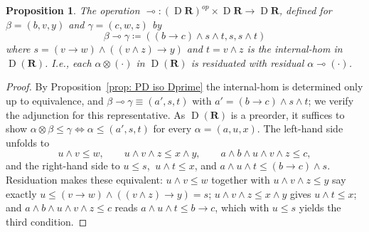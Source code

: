 \documentclass[reqno]{amsart}
\theoremstyle{plain}
\newtheorem{prop}[thm]{Proposition}
\theoremstyle{definition}
\DeclareMathOperator{\D}{D}
\newcommand{\cf}[1]{\mathbf{#1}}
\begin{document}
\begin{prop}\label{prop: internal hom}
    The operation $\multimap:(\D \cf{R})^{op}\times \D \cf{R} \to \D \cf{R}$, defined for $\beta = (b, v, y) $ and $\gamma = (c, w, z) $ by
    \begin{equation*}
        \beta \multimap \gamma \coloneqq ((b \rightarrow c) \wedge s \wedge t, s, s \wedge t)
    \end{equation*}
    where $s = (v \rightarrow w) \wedge ((v \wedge z) \rightarrow y)$ and $ t = v \wedge z $ is the internal-hom in $\D (\cf{R})$. I.e.,  each $ \alpha \otimes {(\cdot)}$ in $\D(\cf{R}) $ is residuated with residual $\alpha \multimap {(\cdot)} $.
\end{prop}
\begin{proof}
    By Proposition~\ref{prop: PD iso Dprime} the internal-hom is determined only up to equivalence, and $\beta \multimap \gamma \equiv (a', s, t)$ with $a' = (b\rightarrow c)\wedge s\wedge t$; we verify the adjunction for this representative. As $\D(\cf{R})$ is a preorder, it suffices to show $\alpha \otimes \beta \leq \gamma \iff \alpha \leq (a', s, t)$ for every $\alpha = (a,u,x)$. The left-hand side unfolds to
    \begin{equation*}
        u\wedge v \leq w, \qquad u\wedge v\wedge z \leq x\wedge y, \qquad a\wedge b\wedge u\wedge v\wedge z \leq c,
    \end{equation*}
    and the right-hand side to $u \leq s$, $\ u\wedge t \leq x$, and $a\wedge u\wedge t \leq (b\rightarrow c)\wedge s$. Residuation makes these equivalent: $u\wedge v\leq w$ together with $u\wedge v\wedge z\leq y$ say exactly $u \leq (v\rightarrow w)\wedge((v\wedge z)\rightarrow y) = s$; $u\wedge v\wedge z\leq x\wedge y$ gives $u\wedge t\leq x$; and $a\wedge b\wedge u\wedge v\wedge z\leq c$ reads $a\wedge u\wedge t\leq b\rightarrow c$, which with $u\leq s$ yields the third condition.
\end{proof}
\end{document}
